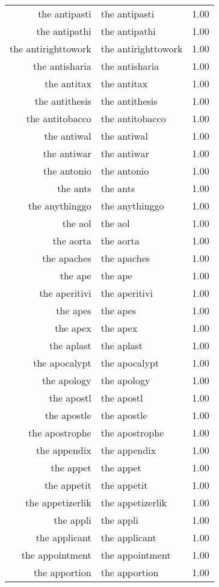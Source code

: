 \begin{table}[ht]
\begin{tabular}{rlr}
  the antipasti & the antipasti & 1.00 \\ 
  the antipathi & the antipathi & 1.00 \\ 
  the antirighttowork & the antirighttowork & 1.00 \\ 
  the antisharia & the antisharia & 1.00 \\ 
  the antitax & the antitax & 1.00 \\ 
  the antithesis & the antithesis & 1.00 \\ 
  the antitobacco & the antitobacco & 1.00 \\ 
  the antiwal & the antiwal & 1.00 \\ 
  the antiwar & the antiwar & 1.00 \\ 
  the antonio & the antonio & 1.00 \\ 
  the ants & the ants & 1.00 \\ 
  the anythinggo & the anythinggo & 1.00 \\ 
  the aol & the aol & 1.00 \\ 
  the aorta & the aorta & 1.00 \\ 
  the apaches & the apaches & 1.00 \\ 
  the ape & the ape & 1.00 \\ 
  the aperitivi & the aperitivi & 1.00 \\ 
  the apes & the apes & 1.00 \\ 
  the apex & the apex & 1.00 \\ 
  the aplast & the aplast & 1.00 \\ 
  the apocalypt & the apocalypt & 1.00 \\ 
  the apology & the apology & 1.00 \\ 
  the apostl & the apostl & 1.00 \\ 
  the apostle & the apostle & 1.00 \\ 
  the apostrophe & the apostrophe & 1.00 \\ 
  the appendix & the appendix & 1.00 \\ 
  the appet & the appet & 1.00 \\ 
  the appetit & the appetit & 1.00 \\ 
  the appetizerlik & the appetizerlik & 1.00 \\ 
  the appli & the appli & 1.00 \\ 
  the applicant & the applicant & 1.00 \\ 
  the appointment & the appointment & 1.00 \\ 
  the apportion & the apportion & 1.00 \\ 

\end{tabular}
\end{table}
